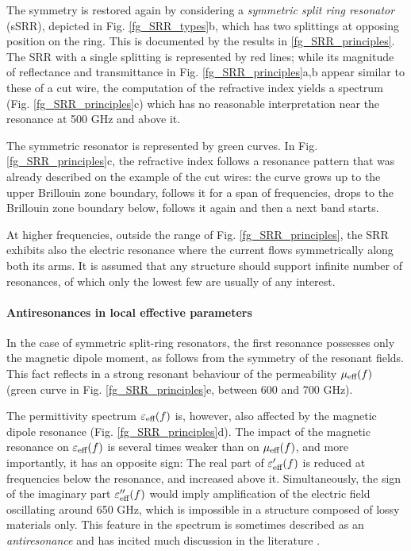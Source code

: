 The symmetry is restored again by considering a \textit{symmetric split ring resonator} (sSRR), depicted in Fig. \ref{fg_SRR_types}b, which has two splittings at opposing position on the ring. 
This is documented by the results in \ref{fg_SRR_principles}. The SRR with a single splitting is represented by red lines; while its magnitude of reflectance and transmittance in Fig. \ref{fg_SRR_principles}a,b appear similar to these of a cut wire, the computation of the refractive index yields a spectrum (Fig. \ref{fg_SRR_principles}c) which has no reasonable interpretation near the resonance at 500 GHz and above it. 

The symmetric resonator is represented by green curves. In Fig. \ref{fg_SRR_principles}c, the refractive index follows a resonance pattern that was already described on the example of the cut wires: the curve grows up to the upper Brillouin zone boundary, follows it for a span of frequencies, drops to the Brillouin zone boundary below, follows it again and then a next band starts. 

At higher frequencies, outside the range of Fig. \ref{fg_SRR_principles}, the SRR exhibits also the electric resonance where the current flows symmetrically along both its arms. It is assumed that any structure should support infinite number of resonances, of which only the lowest few are usually of any interest.
\paragraph{Antiresonances in local effective parameters}%
In the case of symmetric split-ring resonators, the first resonance possesses only the magnetic dipole moment, as follows from the symmetry of the resonant fields. This fact reflects in a strong resonant behaviour of the permeability $\mu_{\text{eff} }(f)$ (green curve in Fig. \ref{fg_SRR_principles}e, between 600 and 700 GHz). 

The permittivity spectrum $\varepsilon_{\text{eff} }(f)$ is, however, also affected by the magnetic dipole resonance  (Fig. \ref{fg_SRR_principles}d). The impact of the magnetic resonance on $\varepsilon_{\text{eff} }(f)$ is several times weaker than on $\mu_{\text{eff} }(f)$, and more importantly, it has an opposite sign: The real part of $\varepsilon_{\text{eff} }'(f)$ is reduced at frequencies below the resonance, and increased above it. Simultaneously, the sign of the imaginary part $\varepsilon_{\text{eff} }''(f)$ would imply amplification of the electric field oscillating around 650 GHz, which is impossible in a structure composed of lossy materials only. This feature in the spectrum is sometimes described as an \textit{antiresonance} and has incited much discussion in the literature \cite{koschny2003resonant, wallen2011anti}. 
